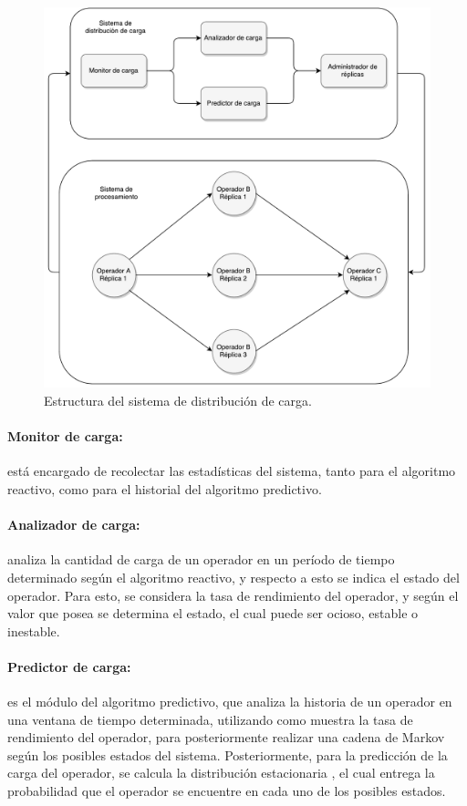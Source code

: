 \begin{figure}[ht!]
  \centering
    \includegraphics[scale=0.5]{images/Diagrama.pdf}
  \caption{Estructura del sistema de distribución de carga.}
  \label{fig:componentesSistemas}
\end{figure}

\paragraph{Monitor de carga:} está encargado de recolectar las estadísticas del sistema, tanto para el algoritmo reactivo, como para el historial del algoritmo predictivo.

\paragraph{Analizador de carga:} analiza la cantidad de carga de un operador en un período de tiempo determinado según el algoritmo reactivo, y respecto a esto se indica el estado del operador. Para esto, se considera la tasa de rendimiento del operador, y según el valor que posea se determina el estado, el cual puede ser ocioso, estable o inestable.

\paragraph{Predictor de carga:} es el módulo del algoritmo predictivo, que analiza la historia de un operador en una ventana de tiempo determinada, utilizando como muestra la tasa de rendimiento del operador, para posteriormente realizar una cadena de Markov según los posibles estados del sistema. Posteriormente, para la predicción de la carga del operador, se calcula la distribución estacionaria \citep{Papoulis1984}, el cual entrega la probabilidad que el operador se encuentre en cada uno de los posibles estados.

